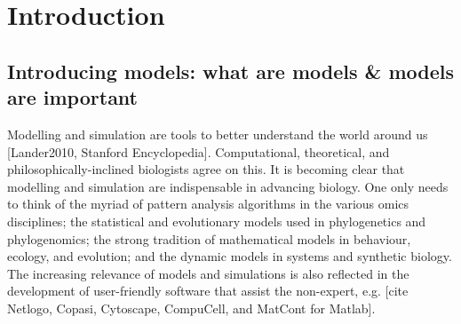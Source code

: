 \section{Introduction}

\subsection{Introducing models: what are models & models are important}

Modelling and simulation are tools to better understand the world around us [Lander2010, Stanford Encyclopedia]. Computational, theoretical, and philosophically-inclined biologists agree on this.  It is becoming clear that modelling and simulation are indispensable in advancing biology. One only needs to think of the myriad of pattern analysis algorithms in the various omics disciplines; the statistical and evolutionary models used in phylogenetics and phylogenomics; the strong tradition of mathematical models in behaviour, ecology, and evolution; and the dynamic models in systems and synthetic biology. The increasing relevance of models and simulations is also reflected in the development of user-friendly software that assist the non-expert, e.g. [cite Netlogo, Copasi, Cytoscape, CompuCell, and MatCont for Matlab].




  